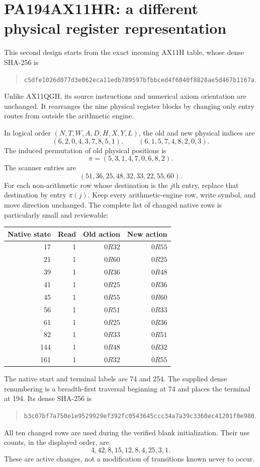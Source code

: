 \documentclass[11pt,letterpaper]{article}
\begin{document}


\section{PA194AX11HR: a different physical register representation}
\label{sec:layout}

This second design starts from the exact incoming AX11H table, whose dense
SHA-256 is
\begin{quote}\small\nolinkurl{c5dfe1026d077d3e062eca11edb789597bfbbced4f6040f8828ae5d467b1167a}.\end{quote}
Unlike AX11QGH, its source instructions and numerical axiom orientation
are unchanged. It rearranges the nine physical register blocks by changing
only entry routes from outside the arithmetic engine.

In logical order $(N,T,W,A,D,H,X,Y,L)$, the old and new physical indices are
\[
 (6,2,0,4,3,7,8,5,1),\qquad (6,1,5,7,4,8,2,0,3).
\]
The induced permutation of old physical positions is
\[
 \pi=(5,3,1,4,7,0,6,8,2).
\]
The scanner entries are
\[
 (51,36,25,48,32,33,22,55,60).
\]
For each non-arithmetic row whose destination is the $j$th entry, replace
that destination by entry $\pi(j)$. Keep every arithmetic-engine row,
write symbol, and move direction unchanged. The complete list of changed
native rows is particularly small and reviewable:

\begin{center}
\begin{tabular}{@{}rrrr@{}}
\toprule Native state & Read & Old action & New action\\\midrule
17&1&$0R32$&$0R55$\\
21&1&$0R60$&$0R25$\\
39&1&$0R36$&$0R48$\\
41&1&$0R25$&$0R36$\\
45&1&$0R55$&$0R60$\\
56&1&$0R51$&$0R33$\\
61&1&$0R25$&$0R36$\\
82&1&$0R33$&$0R51$\\
144&1&$0R48$&$0R32$\\
161&1&$0R32$&$0R55$\\
\bottomrule
\end{tabular}
\end{center}
The native start and terminal labels are 74 and 254. The supplied dense
renumbering is a breadth-first traversal beginning at 74 and places the
terminal at 194. Its dense SHA-256 is
\begin{quote}\small\nolinkurl{b3c07bf7a750e1e9529929ef392fc0543645ccc34a7a39c3360ec41201f0e980}.\end{quote}
All ten changed rows are used during the verified blank initialization.
Their use counts, in the displayed order, are
\[4,42,8,15,12,8,4,25,3,1.\] These are active changes,
not a modification of transitions known never to occur.
\end{document}

